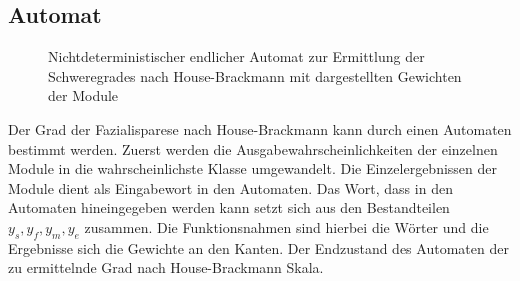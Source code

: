 \subsection{Automat}\label{automata}
\begin{figure}[b]
\begin{center}
\caption[Nichtdeterministischer endlicher Automat zur Ermittlung der Schweregrades nach House-Brackmann mit dargestellten Gewichten der Module]{Nichtdeterministischer endlicher Automat zur Ermittlung der Schweregrades nach House-Brackmann mit dargestellten Gewichten der Module}\label{cap:automata}
\end{center}
\end{figure}\label{fig:automata}

Der Grad der Fazialisparese nach House-Brackmann kann durch einen Automaten bestimmt werden. Zuerst werden die Ausgabewahrscheinlichkeiten der einzelnen Module in die wahrscheinlichste Klasse umgewandelt. Die Einzelergebnissen der Module dient als Eingabewort in den Automaten. Das Wort, dass in den Automaten hineingegeben werden kann setzt sich aus den Bestandteilen $y_s, y_f, y_m, y_e$ zusammen. Die Funktionsnahmen sind hierbei die Wörter und die Ergebnisse sich die Gewichte an den Kanten. Der Endzustand des Automaten der zu ermittelnde Grad nach House-Brackmann Skala.

